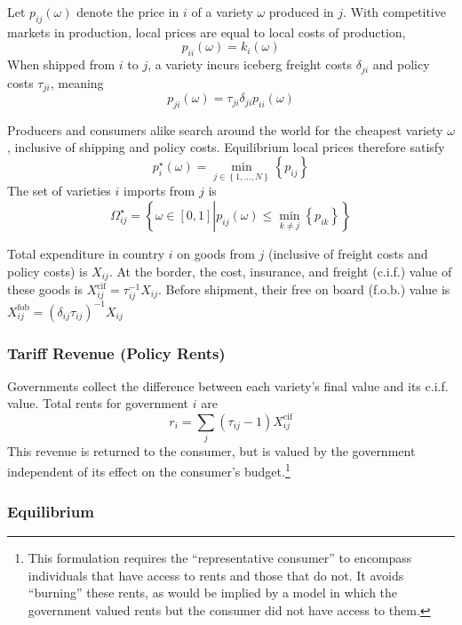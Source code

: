 \documentclass{puthesis}
\begin{document}
Let \(p_{ij}(\omega)\) denote the price in \(i\) of a variety \(\omega\)
produced in \(j\). With competitive markets in production, local prices
are equal to local costs of production, \[
p_{ii}(\omega) = k_i(\omega)
\] When shipped from \(i\) to \(j\), a variety incurs iceberg freight
costs \(\delta_{ji}\) and policy costs \(\tau_{ji}\), meaning \[
p_{ji}(\omega) = \tau_{ji} \delta_{ji} p_{ii}(\omega)
\]

Producers and consumers alike search around the world for the cheapest
variety \(\omega\), inclusive of shipping and policy costs. Equilibrium
local prices therefore satisfy \[
p_i^\star(\omega) = \min_{j \in \left\{ 1,...,N \right\}} \left\{ p_{ij} \right\}
\] The set of varieties \(i\) imports from \(j\) is \[
\Omega_{ij}^\star = \left\{ \omega \in [0,1] \left. \right\vert p_{ij}(\omega) \leq \min_{k \neq j} \left\{ p_{ik} \right\} \right\}
\]

Total expenditure in country \(i\) on goods from \(j\) (inclusive of
freight costs and policy costs) is \(X_{ij}\). At the border, the cost,
insurance, and freight (c.i.f.) value of these goods is
\(X_{ij}^{\text{cif}} = \tau_{ij}^{-1} X_{ij}\). Before shipment, their
free on board (f.o.b.) value is
\(X_{ij}^{\text{fob}} = \left( \delta_{ij} \tau_{ij} \right)^{-1} X_{ij}\)

\subsubsection{Tariff Revenue (Policy Rents)}

Governments collect the difference between each variety's final value
and its c.i.f. value. Total rents for government \(i\) are
\begin{equation} \label{eq:revenue}
r_i = \sum_j (\tau_{ij} - 1) X_{ij}^{\text{cif}}
\end{equation} This revenue is returned to the consumer, but is valued
by the government independent of its effect on the consumer's
budget.\footnote{This formulation requires the ``representative
  consumer'' to encompass individuals that have access to rents and
  those that do not. It avoids ``burning'' these rents, as would be
  implied by a model in which the government valued rents but the
  consumer did not have access to them.}

\subsubsection{Equilibrium}
\end{document}

